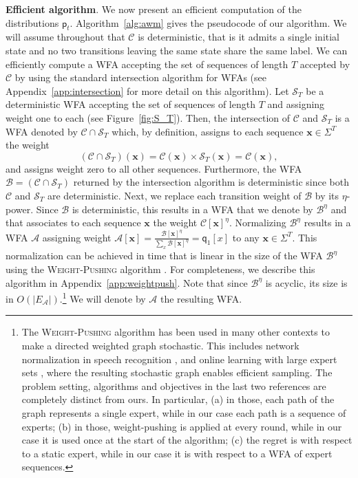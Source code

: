 \documentclass{article}
\newcommand{\sA}{\mathscr A}
\newcommand{\sB}{\mathscr B}
\newcommand{\sC}{\mathscr C}
\newcommand{\sS}{\mathscr S}
\newcommand{\bx}{{\mathbf x}}
\newcommand{\sfp}{{\mathsf p}}
\newcommand{\sfq}{{\mathsf q}}
\newcommand{\cO}{O}
\begin{document}
{\bf Efficient algorithm}. We now present an efficient computation
of the distributions $\sfp_t$.  Algorithm~\ref{alg:awm} gives the
pseudocode of our algorithm.  We will assume throughout that $\sC$ is
deterministic, that is it admits a single initial state and no two
transitions leaving the same state share the same label.  We can
efficiently compute a WFA accepting the set of sequences of length $T$
accepted by $\sC$ by using the standard intersection algorithm for
WFAs (see Appendix~\ref{app:intersection} for more detail on this
algorithm). Let $\sS_T$ be a deterministic WFA accepting the
set of sequences of length $T$ and assigning weight one to each (see
Figure~\ref{fig:S_T}). Then, the intersection of $\sC$ and $\sS_T$ is
a WFA denoted by $\sC \cap \sS_T$ which, by definition, assigns to
each sequence $\bx \in \Sigma^T$ the weight
\begin{equation}
  (\sC \cap \sS_T) (\bx) = \sC(\bx) \times \sS_T(\bx) = \sC(\bx),
\end{equation}
and assigns weight zero to all other sequences. Furthermore, the WFA
$\sB = (\sC \cap \sS_T)$ returned by the intersection algorithm is
deterministic since both $\sC$ and $\sS_T$ are deterministic.  Next,
we replace each transition weight of $\sB$ by its $\eta$-power. Since
$\sB$ is deterministic, this results in a WFA that we denote by
$\sB^\eta$ and that associates to each sequence $\bx$ the weight
$\sC[\bx]^\eta$. Normalizing $\sB^\eta$ results in a WFA $\sA$
assigning weight
$\sA[\bx] = \frac{\sB[\bx]^\eta}{\sum_x \sB[\bx]^\eta} = \sfq_1[x]$ to
any $\bx \in \Sigma^T$.  This normalization can be achieved in time
that is linear in the size of the WFA $\sB^\eta$ using the
\textsc{Weight-Pushing} algorithm \citep{Mohri1997bis,Mohri2009}. For
completeness, we describe this algorithm in
Appendix~\ref{app:weightpush}. Note that since $\sB^\eta$ is acyclic,
its size is in $\cO(|E_\sA|)$.\footnote{The \textsc{Weight-Pushing}
  algorithm has been used in many other contexts to make a directed
  weighted graph stochastic. This includes network normalization in
  speech recognition \citep{MohriRiley2001}, and online learning with
  large expert sets
  \citep{TakimotoWarmuth2003,CortesKuznetsovMohriWarmuth2015}, where
  the resulting stochastic graph enables efficient sampling.  The
  problem setting, algorithms and objectives in the last two
  references are completely distinct from ours. In particular, (a) in
  those, each path of the graph represents a single expert, while in
  our case each path is a sequence of experts; (b) in those,
  weight-pushing is applied at every round, while in our case it is
  used once at the start of the algorithm; (c) the regret is with
  respect to a static expert, while in our case it is with respect to
  a WFA of expert sequences.}  We will denote by $\sA$ the resulting
WFA.
\end{document}

